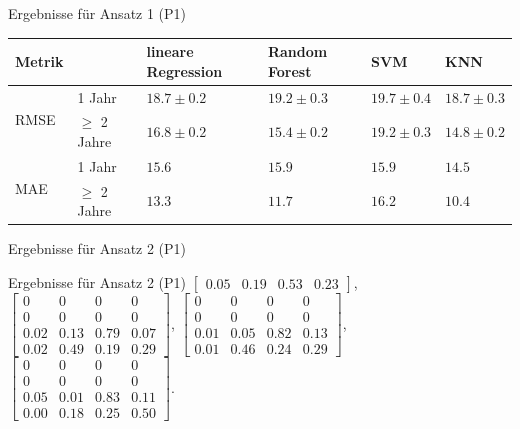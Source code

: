 \documentclass[17pt, fleqn]{beamer}
\begin{document}
\begin{frame}{Ergebnisse für Ansatz 1 (P1)}
    \pause
    \scriptsize{
    \begin{table}[ht]
        \begin{tabular}{ p{1cm} p{1cm} p{1.5cm} p{1.5cm} p{1.5cm} p{1.5cm} }
          Metrik &               & lineare Regression & Random Forest  & SVM            & KNN \\
          \hline
          
          \multirow{2}{3em}{RMSE}
                 & 1 Jahr        & $18.7 \pm 0.2$     & $19.2 \pm 0.3$ & $19.7 \pm 0.4$ & $18.7 \pm 0.3$       \\
                 & $\geq$ 2 Jahre & $16.8 \pm 0.2$     & $15.4 \pm 0.2$ & $19.2 \pm 0.3$ & $14.8 \pm 0.2$        \\
      
          \hline
          \multirow{2}{3em}{MAE}
                 & 1 Jahr        & $15.6$             & $15.9$         & $15.9$         & $14.5$        \\
                 & $\geq$ 2 Jahre & $13.3$             & $11.7$         & $16.2$         & $10.4$        \\
      
          \hline
        \end{tabular}
      \end{table}
    }
    
\end{frame}

\begin{frame}{Ergebnisse für Ansatz 2 (P1)}
    \pause    
    \begin{scriptsize}
	\end{scriptsize}
\end{frame}

\begin{frame}{Ergebnisse für Ansatz 2 (P1)}
    \footnotesize{
    $\left[ \begin{array}{rrrr}  0.05 & 0.19 & 0.53 & 0.23  \end{array}\right]$,
    $\left[ \begin{array}{rrrr} 0 & 0 & 0 & 0 \\  0 & 0 & 0 & 0 \\ 0.02 & 0.13 & 0.79 & 0.07 \\ 0.02 & 0.49 & 0.19 & 0.29 \end{array}\right]$,
    $\left[ \begin{array}{rrrr} 0 & 0 & 0 & 0 \\  0 & 0 & 0 & 0 \\ 0.01 & 0.05  & 0.82  & 0.13 \\ 0.01 & 0.46 & 0.24 & 0.29 \end{array}\right]$,
    $\left[ \begin{array}{rrrr} 0 & 0 & 0 & 0 \\  0 & 0 & 0 & 0 \\ 0.05 & 0.01 & 0.83 & 0.11\\ 0.00& 0.18 & 0.25 & 0.50\end{array}\right]$.
    }
\end{frame}
\end{document}
